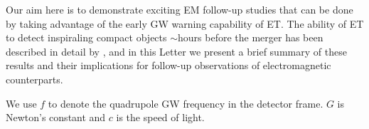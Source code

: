 \documentclass{aa}
\begin{document}
Our aim here is to demonstrate exciting EM follow-up studies that can be done by taking advantage of the early GW warning capability of ET. 
The ability of ET to detect inspiraling compact objects $\sim$hours before the merger has been described in detail by \cite{Akcay18}, and in this Letter we 
present a brief summary of these results and their implications for follow-up observations of electromagnetic counterparts.

We use $f$ to denote the quadrupole GW frequency
in the detector frame. $G$ is Newton's constant and $c$ is the speed of light.
\end{document}
